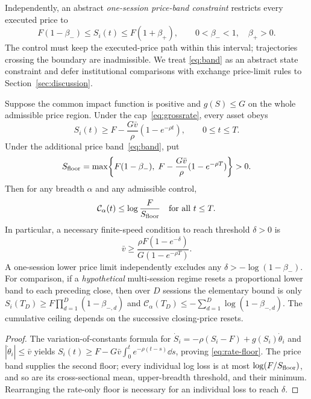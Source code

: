 \documentclass[review,hidelinks,onefignum,onetabnum]{siamonline250211}
\begin{document}
Independently, an abstract \emph{one-session price-band constraint} restricts every executed price to
\begin{equation}\label{eq:band}
 F(1-\beta_-)\le S_i(t)\le F(1+\beta_+),\qquad
 0<\beta_-<1,\quad\beta_+>0.
\end{equation}
The control must keep the executed-price path within this interval; trajectories crossing the boundary are inadmissible. We treat \eqref{eq:band} as an abstract state constraint and defer institutional comparisons with exchange price-limit rules to Section~\ref{sec:discussion}.

\begin{proposition}\label{prop:rate-band}
Suppose the common impact function is positive and $g(S)\le G$ on the whole admissible price region. Under the cap~\eqref{eq:grossrate}, every asset obeys
\begin{equation}\label{eq:rate-floor}
 S_i(t)\ge F-\frac{G\bar v}{\rho}(1-e^{-\rho t}),\qquad 0\le t\le T.
\end{equation}
Under the additional price band~\eqref{eq:band}, put
\begin{equation}\label{eq:twofloors}
 S_{\rm floor}=\max\!\left\{F(1-\beta_-),\;F-\frac{G\bar v}{\rho}(1-e^{-\rho T})\right\}>0.
\end{equation}
Then for any breadth $\alpha$ and any admissible control,
\begin{equation}\label{eq:constrained-crisis}
\ \mathcal C_\alpha(t)\le \log\frac{F}{S_{\rm floor}}\quad\hbox{for all }t\le T.\ 
\end{equation}
In particular, a necessary finite-speed condition to reach threshold $\delta>0$ is
\begin{equation}\label{eq:min-speed}
\ \bar v\ge\frac{\rho F(1-e^{-\delta})}{G(1-e^{-\rho T})}.\ 
\end{equation}
A one-session lower price limit independently excludes any $\delta> -\log(1-\beta_-)$. For comparison, if a \emph{hypothetical} multi-session regime resets a proportional lower band to each preceding close, then over $D$ sessions the elementary bound is only
$S_i(T_D)\ge F\prod_{d=1}^D(1-\beta_{-,d})$ and
$\mathcal C_\alpha(T_D)\le-\sum_{d=1}^D\log(1-\beta_{-,d})$.
The cumulative ceiling depends on the successive closing-price resets.
\end{proposition}
\begin{proof}
The variation-of-constants formula for $\dot S_i=-\rho(S_i-F)+g(S_i)\dot\theta_i$ and $|\dot\theta_i|\le\bar v$ yields $S_i(t)\ge F-G\bar v\int_0^t e^{-\rho(t-s)}\dd s$, proving \eqref{eq:rate-floor}. The price band supplies the second floor; every individual log loss is at most $\log(F/S_{\rm floor})$, and so are its cross-sectional mean, upper-breadth threshold, and their minimum. Rearranging the rate-only floor is necessary for an individual loss to reach $\delta$.
\end{proof}
\end{document}
